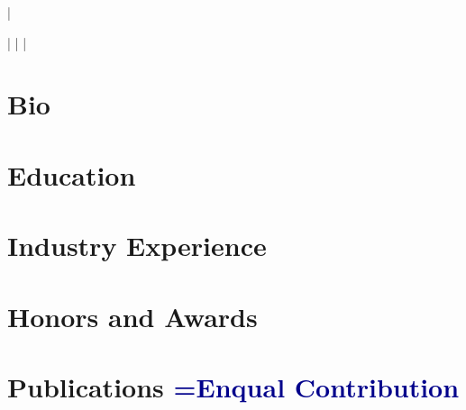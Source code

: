 \documentclass[a4paper,11pt]{article}
\newcommand{\socialicon}[1]{\raisebox{-0.05em}{\resizebox{!}{1em}{#1}}}
\newcommand{\headerfontiii}{\fontfamily{ppl}\selectfont} %
\newcommand{\orcid}[1]{\href{https://orcid.org/#1}{\textcolor[HTML]{A6CE39}{\faOrcid} \myName}}
\begin{document}
\headerfontiii



\begin{center}
    {\Huge\textbf{\myName}}
\end{center}
\vspace{-6mm}

\begin{center}
    \small{
    \href{mailto:\myEmail}{\myEmail} | 
    \href{https://\myWebsite}{\myWebsite}
    }
\end{center}
\vspace{-6mm}

\begin{center}
    \small{
    \socialicon{\faLinkedin} \href{\myLinkedIn}{\myLinkedInProfile} | 
    \socialicon{\faGithub} \href{https://github.com/\myGithub}{\myGithub} |
    \orcid{\myOrcid} |
    \socialicon{\aiGoogleScholar} \href{\myGoogleScholar}{\myName}
    }
\end{center}
\vspace{-6mm}
\begin{center}
    \small{\myCity}
\end{center}

\vspace{-4mm}
\section{\textbf{Bio}}

\section{\textbf{Education}}


\section{\textbf{Industry Experience}}


\section{\textbf{Honors and Awards}}


\section{\textbf{Publications} \hfill \textcolor{darkblue}{\scriptsize *=Enqual Contribution}}
{\small

}
\end{document}
